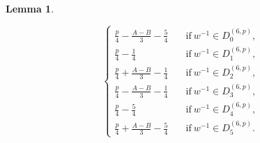 \documentclass[letter]{ieice}
\newtheorem{sec3_lemma3}[sec3_lemma1]{Lemma}
\begin{document}
\begin{sec3_lemma3}
\begin{itemize}
\begin{equation*}
\begin{cases}
\frac{p}{4}-\frac{A-B}{3}-\frac{5}{4}&\quad \mbox{if}\ w^{-1} \in  D_{0}^{(6,p)},\\
\frac{p}{4}-\frac{1}{4}&\quad \mbox{if}\ w^{-1} \in  D_{1}^{(6,p)},\\
\frac{p}{4}+\frac{A-B}{3}-\frac{1}{4}&\quad \mbox{if}\ w^{-1} \in  D_{2}^{(6,p)},\\
\frac{p}{4}-\frac{A-B}{3}-\frac{1}{4}&\quad \mbox{if}\ w^{-1} \in  D_{3}^{(6,p)},\\
\frac{p}{4}-\frac{5}{4}&\quad \mbox{if}\ w^{-1} \in  D_{4}^{(6,p)},\\
\frac{p}{4}+\frac{A-B}{3}-\frac{5}{4}&\quad \mbox{if}\ w^{-1} \in  D_{5}^{(6,p)}.
\end{cases}
\end{equation*}
\end{itemize}
\end{sec3_lemma3}               
\end{document}
